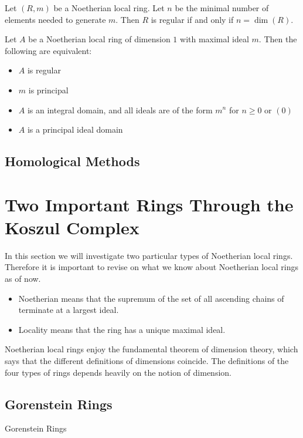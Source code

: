 \documentclass[a4paper]{article}
\begin{document}
\begin{lmm}{}{} Let $(R,m)$ be a Noetherian local ring. Let $n$ be the minimal number of elements needed to generate $m$. Then $R$ is regular if and only if $n=\dim(R)$. 
\end{lmm}

\begin{thm}{}{} Let $A$ be a Noetherian local ring of dimension $1$ with maximal ideal $m$. Then the following are equivalent: 
\begin{itemize}
\item $A$ is regular
\item $m$ is principal
\item $A$ is an integral domain, and all ideals are of the form $m^n$ for $n\geq 0$ or $(0)$
\item $A$ is a principal ideal domain
\end{itemize}
\end{thm}


\subsection{Homological Methods}

\pagebreak
\section{Two Important Rings Through the Koszul Complex}
In this section we will investigate two particular types of Noetherian local rings. Therefore it is important to revise on what we know about Noetherian local rings as of now. 
\begin{itemize}
\item Noetherian means that the supremum of the set of all ascending chains of terminate at a largest ideal. 
\item Locality means that the ring has a unique maximal ideal. 
\end{itemize}
Noetherian local rings enjoy the fundamental theorem of dimension theory, which says that the different definitions of dimensions coincide. The definitions of the four types of rings depends heavily on the notion of dimension. 

\subsection{Gorenstein Rings}
\begin{defn}{Gorenstein Rings}{}
\end{defn}
\end{document}
